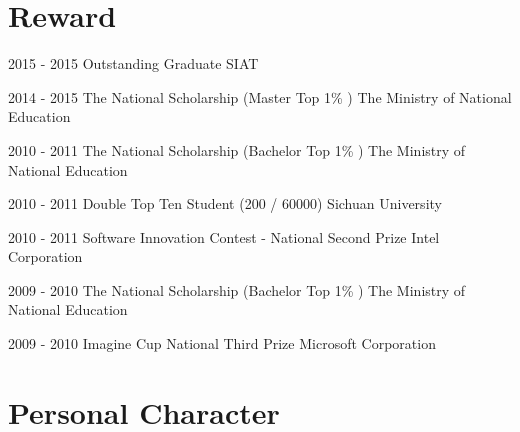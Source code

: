 \documentclass[]{friggeri-cv}
\begin{document}
\section{Reward}
\begin{entrylist}
    \entry
    {2015 - 2015}
    {Outstanding Graduate}
    {SIAT}
    {}
    
    \entry
    {2014 - 2015}
    {The National Scholarship (Master Top 1\% )}
    {The Ministry of National Education}
    {}
    
    \entry
    {2010 - 2011}
    {The National Scholarship (Bachelor Top 1\% )}
    {The Ministry of National Education}
    {}
    
    \entry
    {2010 - 2011}
    {Double Top Ten Student (200 / 60000)}
    {Sichuan University}
    {}

    \entry
    {2010 - 2011}
    {Software Innovation Contest - National Second Prize}
    {Intel Corporation}
    {}

    \entry
    {2009 - 2010}
    {The National Scholarship (Bachelor Top 1\% )}
    {The Ministry of National Education}
    {}
    
    \entry
    {2009 - 2010}
    {Imagine Cup National Third Prize}
    {Microsoft Corporation}
    {}

\end{entrylist}

\section{Personal Character}
\vspace{.1cm}
\end{document}

